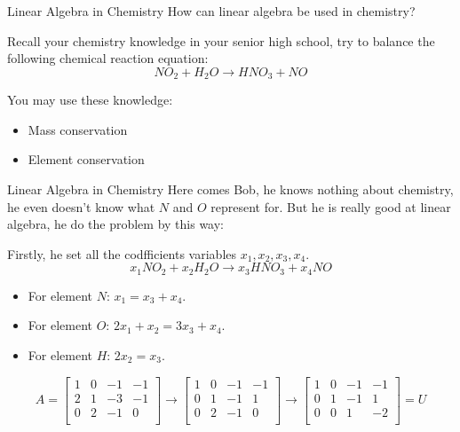 \documentclass{beamer}
\begin{document}
\begin{frame}{Linear Algebra in Chemistry}
How can linear algebra be used in chemistry?

\vspace{3pt}
Recall your chemistry knowledge in your senior high school, try to balance the following chemical reaction equation:
\begin{equation*}
    NO_2+H_2O\rightarrow HNO_3+NO
\end{equation*}

You may use these knowledge:
\begin{itemize}
    \item Mass conservation
    \item Element conservation
\end{itemize}
\end{frame}

\begin{frame}{Linear Algebra in Chemistry}
Here comes Bob, he knows nothing about chemistry, he even doesn't know what $N$ and $O$ represent for. But he is really good at linear algebra, he do the problem by this way:

\vspace{3pt}
Firstly, he set all the codfficients variables $x_1,x_2,x_3,x_4$.
\begin{equation*}
    x_1NO_2+x_2H_2O\rightarrow x_3HNO_3+x_4NO
\end{equation*}

\begin{itemize}
    \item For element $N$: $x_1=x_3+x_4$.
    \item For element $O$: $2x_1+x_2=3x_3+x_4$.
    \item For element $H$: $2x_2=x_3$.
\end{itemize}

\begin{equation*}
    A=\left[ \begin{matrix}
        1&		0&		-1&		-1\\
        2&		1&		-3&		-1\\
        0&		2&		-1&		0\\
    \end{matrix} \right] \rightarrow \left[ \begin{matrix}
        1&		0&		-1&		-1\\
        0&		1&		-1&		1\\
        0&		2&		-1&		0\\
    \end{matrix} \right] \rightarrow \left[ \begin{matrix}
        1&		0&		-1&		-1\\
        0&		1&		-1&		1\\
        0&		0&		1&		-2\\
    \end{matrix} \right]=U
\end{equation*}
\end{frame}
\end{document}
